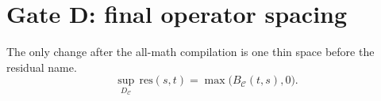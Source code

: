 \documentclass[11pt]{article}
\begin{document}
\section*{Gate D: final operator spacing}
The only change after the all-math compilation is one thin space before the residual name.
\[
\sup_{D_{\mathcal C}}\,\mathrm{res}(s,t)
 =\max\bigl(B_{\mathcal C}(t,s),0\bigr).
\tag{3}
\]
\end{document}
